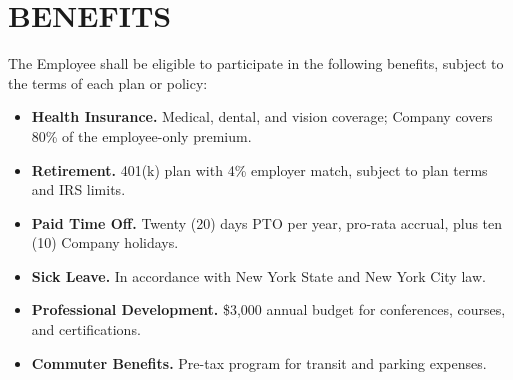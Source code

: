 \section{BENEFITS}

The Employee shall be eligible to participate in the following benefits, subject to the terms of each plan or policy:

\parsp
\begin{itemize}
  \item \textbf{Health Insurance.} Medical, dental, and vision coverage; Company covers 80\% of the employee-only premium.
  \item \textbf{Retirement.} 401(k) plan with 4\% employer match, subject to plan terms and IRS limits.
  \item \textbf{Paid Time Off.} Twenty (20) days PTO per year, pro-rata accrual, plus ten (10) Company holidays.
  \item \textbf{Sick Leave.} In accordance with New York State and New York City law.
  \item \textbf{Professional Development.} \$3,000 annual budget for conferences, courses, and certifications.
  \item \textbf{Commuter Benefits.} Pre-tax program for transit and parking expenses.
\end{itemize}

